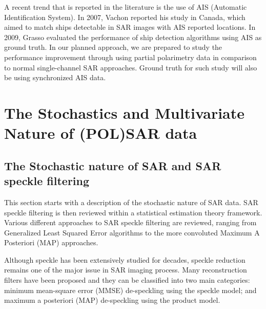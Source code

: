 A recent trend that is reported in the literature is the use of AIS (Automatic Identification System).
In 2007, Vachon \cite{Vachon_2007_IGARSS} reported his study in Canada, which aimed to match ships detectable in SAR images with AIS reported locations.
In 2009, Grasso \cite{Grasso_2009_ISDA} evaluated the performance of ship detection algorithms using AIS as ground truth.
In our planned approach, we are prepared to study the performance improvement through using partial polarimetry data in comparison to normal single-channel SAR approaches.
Ground truth for such study will also be using synchronized AIS data.

\section{The Stochastics and Multivariate Nature of (POL)SAR data}

\subsection{The Stochastic nature of SAR  and SAR speckle filtering }

This section starts with a description of the stochastic nature of SAR data. 
SAR speckle filtering is then reviewed within a statistical estimation theory framework. 
Various different approaches to SAR speckle filtering are reviewed, 
	ranging from Generalized Least Squared Error algorithms
	to the more convoluted Maximum A Posteriori (MAP) approaches.

Although speckle has been extensively studied for decades, speckle reduction remains one of the major issue in SAR imaging process. 
Many reconstruction filters have been proposed and they can be classified into two main categories: 
	minimum mean-square error (MMSE) de-speckling using the speckle model; 
	and maximum a posteriori (MAP) de-speckling using the product model. 

